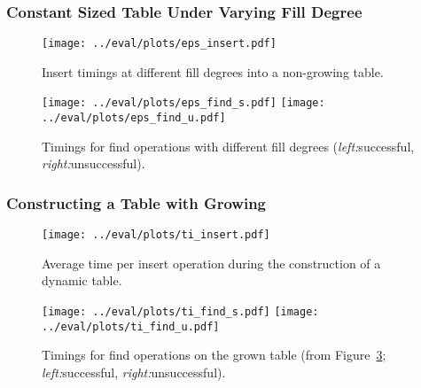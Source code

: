 \documentclass[a4paper,UKenglish]{lipics-v2016}
\begin{document}
\subsubsection*{Constant Sized Table Under Varying Fill Degree}
\begin{figure}
  \texttt{[image: ../eval/plots/eps\_insert.pdf]}
  \caption{Insert timings at different fill degrees into a non-growing table.}
  \label{fig:eps_insert}
\end{figure}
\begin{figure}
  \texttt{[image: ../eval/plots/eps\_find\_s.pdf]}
  \texttt{[image: ../eval/plots/eps\_find\_u.pdf]}
  \caption{Timings for find operations with different fill degrees (\emph{left:}successful, \emph{right:}unsuccessful).}
  \label{fig:eps_find}
\end{figure}

\subsubsection*{Constructing a Table with Growing}


\begin{figure}
  \texttt{[image: ../eval/plots/ti\_insert.pdf]}
  \caption{Average time per insert operation during the construction of a dynamic table.}
  \label{fig:ti_insert}
\end{figure}
\begin{figure}
  \texttt{[image: ../eval/plots/ti\_find\_s.pdf]}
  \texttt{[image: ../eval/plots/ti\_find\_u.pdf]}
  \caption{Timings for find operations on the grown table (from Figure~\ref{fig:ti_insert}; \emph{left:}successful, \emph{right:}unsuccessful).}
  \label{fig:ti_find}
\end{figure}





\end{document}
